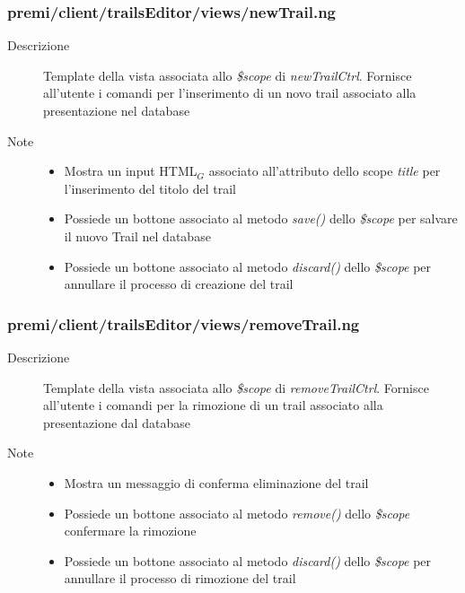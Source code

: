 \subsubsection{premi/client/trailsEditor/views/newTrail.ng}

\begin{description}
\item[Descrizione] \hfill
	Template della vista associata allo \textit{\$scope} di \textit{newTrailCtrl}. Fornisce all'utente i comandi per l'inserimento di un novo trail associato alla presentazione nel database
\item[Note] \hfill
	\begin{itemize}
			\item Mostra un input HTML$_G$ associato all'attributo dello scope \textit{title} per l'inserimento del titolo del trail
			\item Possiede un bottone associato al metodo \textit{save()} dello \textit{\$scope} per salvare il nuovo Trail nel database
			\item Possiede un bottone associato al metodo \textit{discard()} dello \textit{\$scope} per annullare il processo di creazione del trail
	\end{itemize}
\end{description}

\subsubsection{premi/client/trailsEditor/views/removeTrail.ng}

\begin{description}
\item[Descrizione] \hfill
	Template della vista associata allo \textit{\$scope} di \textit{removeTrailCtrl}. Fornisce all'utente i comandi per la rimozione di un trail associato alla presentazione dal database
\item[Note] \hfill
	\begin{itemize}
			\item Mostra un messaggio di conferma eliminazione del trail
			\item Possiede un bottone associato al metodo \textit{remove()} dello \textit{\$scope} confermare la rimozione
			\item Possiede un bottone associato al metodo \textit{discard()} dello \textit{\$scope} per annullare il processo di rimozione del trail
	\end{itemize}
\end{description}

